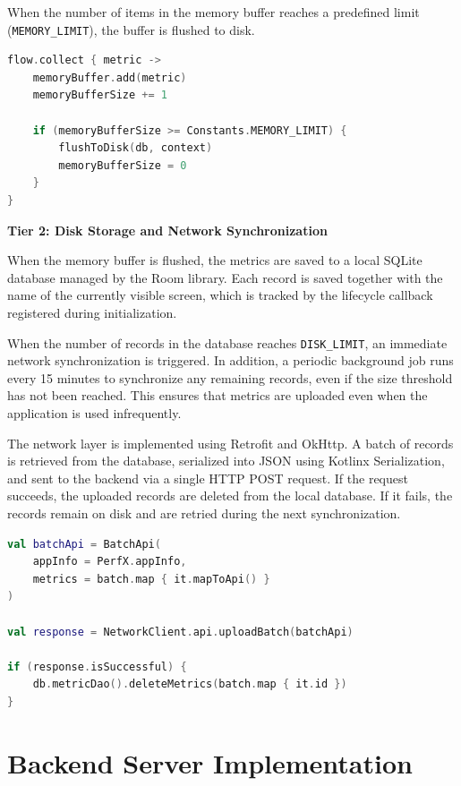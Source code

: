 When the number of items in the memory buffer reaches a predefined limit (\texttt{MEMORY\_LIMIT}), the buffer is flushed to disk.

\begin{lstlisting}[language=Kotlin, caption={In-Memory Buffering}]
flow.collect { metric ->
    memoryBuffer.add(metric)
    memoryBufferSize += 1

    if (memoryBufferSize >= Constants.MEMORY_LIMIT) {
        flushToDisk(db, context)
        memoryBufferSize = 0
    }
}
\end{lstlisting}

\textbf{Tier 2: Disk Storage and Network Synchronization}

When the memory buffer is flushed, the metrics are saved to a local SQLite database managed by the Room library. Each record is saved together with the name of the currently visible screen, which is tracked by the lifecycle callback registered during initialization.

When the number of records in the database reaches \texttt{DISK\_LIMIT}, an immediate network synchronization is triggered. In addition, a periodic background job runs every 15 minutes to synchronize any remaining records, even if the size threshold has not been reached. This ensures that metrics are uploaded even when the application is used infrequently.

The network layer is implemented using Retrofit and OkHttp. A batch of records is retrieved from the database, serialized into JSON using Kotlinx Serialization, and sent to the backend via a single HTTP POST request. If the request succeeds, the uploaded records are deleted from the local database. If it fails, the records remain on disk and are retried during the next synchronization.

\begin{lstlisting}[language=Kotlin, caption={Network Synchronization}]
val batchApi = BatchApi(
    appInfo = PerfX.appInfo,
    metrics = batch.map { it.mapToApi() }
)

val response = NetworkClient.api.uploadBatch(batchApi)

if (response.isSuccessful) {
    db.metricDao().deleteMetrics(batch.map { it.id })
}
\end{lstlisting}

\section{Backend Server Implementation}
\label{sec:backend_impl}

